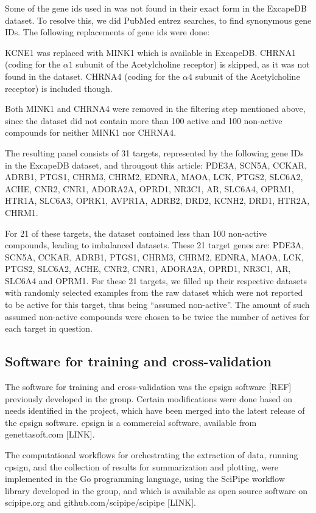 \documentclass[utf8]{frontiersSCNS} %
\newcommand{\todoil}[1]{\todo[inline]{#1}}
\begin{document}
Some of the gene ids used in \cite{Bowes2012} was not found in their exact form in
the ExcapeDB dataset. To resolve this, we did PubMed entrez searches, to find
synonymous gene IDs. The following replacements of gene ids were done:

KCNE1 was replaced with MINK1 which is available in ExcapeDB. CHRNA1 (coding
for the $\alpha1$ subunit of the Acetylcholine receptor) is skipped, as it was
not found in the dataset. CHRNA4 (coding for the $\alpha4$ subunit of the
Acetylcholine receptor) is included though.

Both MINK1 and CHRNA4 were removed in the filtering step mentioned above, since
the dataset did not contain more than 100 active and 100 non-active compounds
for neither MINK1 nor CHRNA4.

The resulting panel consists of 31 targets, represented by the following gene
IDs in the ExcapeDB dataset, and througout this article: PDE3A,
SCN5A, CCKAR, ADRB1, PTGS1, CHRM3, CHRM2, EDNRA, MAOA, LCK,
PTGS2, SLC6A2, ACHE, CNR2, CNR1, ADORA2A, OPRD1, NR3C1, AR,
SLC6A4, OPRM1, HTR1A, SLC6A3, OPRK1, AVPR1A, ADRB2, DRD2,
KCNH2, DRD1, HTR2A, CHRM1.

For 21 of these targets, the dataset contained less than 100 non-active
compounds, leading to imbalanced datasets. These 21 target genes are: PDE3A,
SCN5A, CCKAR, ADRB1, PTGS1, CHRM3, CHRM2, EDNRA, MAOA, LCK, PTGS2, SLC6A2,
ACHE, CNR2, CNR1, ADORA2A, OPRD1, NR3C1, AR, SLC6A4 and OPRM1. For these 21
targets, we filled up their respective datasets with randomly selected
examples from the raw dataset which were not reported to be active for this
target, thus being ``assumed non-active''. The amount of such assumed
non-active compounds were chosen to be twice the number of actives for each
target in question.

\subsection{Software for training and cross-validation}

The software for training and cross-validation was the cpsign software [REF]
previously developed in the group. Certain modifications were done based on
needs identified in the project, which have been merged into the latest
release of the cpsign software. cpsign is a commercial software, available
from genettasoft.com [LINK]. \todoil{Add something about academic licenses?}

The computational workflows for orchestrating the extraction of data, running
cpsign, and the collection of results for summarization and plotting, were
implemented in the Go programming language, using the SciPipe workflow library
developed in the group, and which is available as open source software on
scipipe.org and github.com/scipipe/scipipe [LINK].
\end{document}
